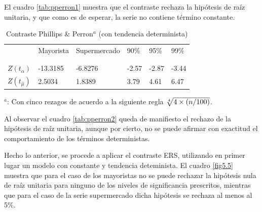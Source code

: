 \documentclass[12pt, twoside]{book}\usepackage[]{graphicx}\usepackage[]{color}
\numberwithin{equation}{section}
\numberwithin{theorem}{section}
\numberwithin{teorema}{section}
\numberwithin{defi}{section}
\numberwithin{prop}{section}
\numberwithin{defi}{section}
\theoremstyle{plain}
\begin{document}
El cuadro \ref{tab:pperron1} muestra que el contraste rechaza la hipótesis de raíz unitaria, y que como es de esperar, la serie no contiene término constante. 





\begin{table}[!htpb]
\centering
\begin{threeparttable}
\caption{Contraste Phillips \& Perron$^{a}$ (con tendencia determinista) \label{tab:pperron2}}
\begin{tabular}{@{}llllll@{}}
\toprule
\multicolumn{1}{c}{} &
\multicolumn{1}{l}{Mayorista} & 
\multicolumn{1}{l}{Supermercado} & 
90\% & 95\% & 99\% \\ 
\\
\cmidrule(l){2-2} \cmidrule(l){3-3} \cmidrule(l){4-6} \\
$Z(t_{\hat{\alpha}})$ & -13.3185 & -6.8276 &  -2.57 & -2.87 & -3.44 \\
$Z(t_{\hat{\mu}})$ & 2.5034 & 1.8389 & 3.79 & 4.61 & 6.47 \\
\bottomrule
\end{tabular}
\label{tab-5}
\begin{tablenotes}
\small 
\item $^{a}$: Con cinco rezagos de acuerdo a la siguiente regla $\root 4 \of {4 \times (n/100)}$. 
\end{tablenotes}
\end{threeparttable}
\end{table}

Al observar el cuadro \ref{tab:pperron2} queda de manifiesto el rechazo de la hipótesis de raíz unitaria, aunque por cierto, no se puede afirmar con exactitud el comportamiento de los términos deterministas. 



Hecho lo anterior, se procede a aplicar el contraste ERS, utilizando en primer lugar un modelo con constante y tendencia deteminista. El cuadro \ref{fig5.5} muestra que para el caso de los mayoristas no se puede rechazar la hipótesis nula de raíz unitaria para ninguno de los niveles de significancia prescritos, mientras que para el caso de la serie supermercado dicha hipótesis se rechaza al menos al 5\%.  
\end{document}
